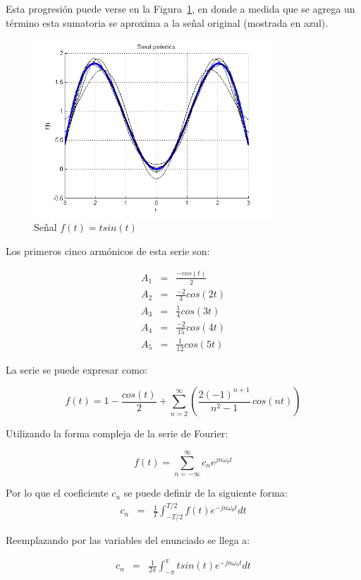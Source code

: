 \documentclass[a4paper]{article}
\begin{document}
Esta progresión puede verse en la Figura~\ref{fig_1b}, en donde a medida que se agrega un término esta sumatoria se aproxima a la señal original (mostrada en azul).

\begin{figure}[!t]
\centering
\includegraphics[width=3.5in]{imgs/tsint.png}
\caption{Señal $f(t) = tsin(t)$}
\label{fig_1b}
\end{figure}

Los primeros cinco armónicos de esta serie son:

\begin{eqnarray*}
A_1 &=& \frac{-cos(t)}{2} \\
A_2 &=& \frac{-2}{3} cos(2t) \\
A_3 &=& \frac{1}{4} cos(3t) \\
A_4 &=& \frac{-2}{15} cos(4t) \\
A_5 &=& \frac{1}{12} cos(5t)
\end{eqnarray*}

La serie se puede expresar como:

$$f(t) = 1 - \frac{cos(t)}{2} + \sum_{n=2}^\infty\left( \frac{2(-1)^{n+1}}{n^2 - 1} \,cos(n t) \right)$$

Utilizando la forma compleja de la serie de Fourier:


$$f(t) =  \sum_{n=-\infty}^\infty c_n e^{jn\omega_0t} $$


Por lo que el coeficiente $c_n$ se puede definir de la siguiente forma:
\begin{eqnarray*}
c_n &=& \frac{1}{T}\int_{-T/2}^{T/2}f(t)e^{-jn\omega_0t}dt
\end{eqnarray*}

Reemplazando por las variables del enunciado se llega a:

\begin{eqnarray*}
c_n &=& \frac{1}{2\pi}\int_{-\pi}^{\pi}tsin(t)e^{-jn\omega_0t}dt
\end{eqnarray*}
\end{document}
